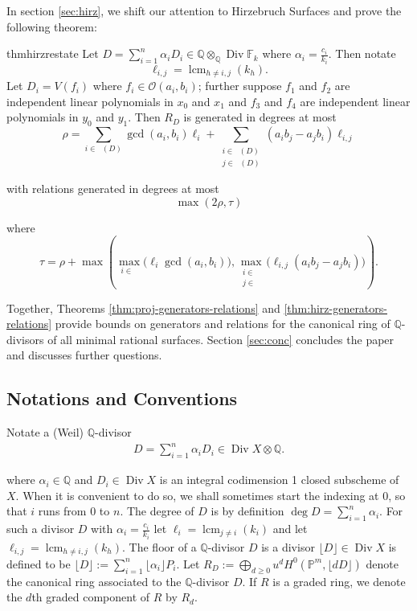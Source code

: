 \documentclass{amsart}
\theoremstyle{plain}
\theoremstyle{definition}
\theoremstyle{remark}
\numberwithin{equation}{section}
\newcommand\ssec{\subsection}
\newcommand\bq{{\mathbb Q}}
\newcommand\bp{{\mathbb P}}
\newcommand\sco{{\mathscr O}}
\DeclareMathOperator\di{Div}
\newcommand\bida{a}
\newcommand\bidb{b}
\newcommand\hirz{\mathbb{F}}
\DeclareMathOperator{\Te}{T_=}
\DeclareMathOperator{\Tp}{T_+}
\DeclareMathOperator{\Tm}{T_-}
\DeclareMathOperator{\lcm}{lcm}
\begin{document}
\noindent
In section \ref{sec:hirz}, we shift our attention to Hirzebruch Surfaces and prove the following theorem:

\begin{restatable}{thm}{hirzrestate}
\label{thm:hirz-generators-relations}
Let $D = \sum_{i=1}^n \alpha_i D_i \in \bq \otimes_\bq \di \hirz_k$ 
where $\alpha_i = \frac{c_i}{k_i}$.
Then notate
\[\ell_{i,j} = \lcm_{h\ne i,j}(k_h).\] 
Let $D_i =
V(f_i)$ where $f_i \in \sco(a_i, b_i)$; further suppose $f_1$ and $f_2$ are
independent linear
polynomials in $x_0$ and $x_1$ and $f_3$ and $f_4$ are independent
linear polynomials in $y_0$ and $y_1$.
Then $R_D$ is generated in degrees at most
\[
	\rho = \sum_{i\in \Te(D)} \gcd(\bida_i, \bidb_i)\ell_i +
	\sum_{\substack{i \in \Tp(D) \\	j \in \Tm(D)}} (\bida_i \bidb_j
	- \bida_j \bidb_i) \ell_{i, j}
\]

\noindent
with relations generated in degrees at most 
\[
	\max(2 \rho, \tau)
\]

\noindent
where
\[
	\tau = \rho
	+ \max \left( \max_{i\in \Te} \bigl(\ell_i \gcd(a_i, b_i) \bigr),
	\max_{\substack{i \in \Tp \\ j \in \Tm}} \bigl(\ell_{i, j}
	(\bida_i \bidb_j - \bida_j \bidb_i) \bigr) \right).
\]
\end{restatable}

\noindent
Together, Theorems \ref{thm:proj-generators-relations} and \ref{thm:hirz-generators-relations} provide bounds on generators and relations for the canonical ring of $\bq$-divisors of all minimal rational surfaces.  Section \ref{sec:conc} concludes the paper and discusses further questions.

\ssec{Notations and Conventions}
Notate a (Weil) $\bq$-divisor
\begin{align*}
	D = \sum_{i=1}^{n}\alpha_i D_i \in \di X \otimes \bq.
\end{align*}

\noindent
where $\alpha_i \in \bq$ and $D_i \in \di X$ is an integral codimension 1 closed subscheme of $X$. When it is convenient to do so, we shall sometimes start the indexing at $0$, so that $i$ runs from $0$ to $n$. The degree of $D$ is by definition $\deg D = \sum_{i=1}^{n}\alpha_i$. For such a divisor $D$ with $\alpha_i = \frac{c_i}{k_i}$ let $\ell_i = \lcm_{j\ne i}(k_i)$
and let $\ell_{i,j} = \lcm_{h\ne i,j}(k_h).$ The floor of a $\bq$-divisor $D$ is a divisor $\lfloor D
\rfloor \in \di X$ is defined to be $\lfloor D \rfloor := \sum_{i = 1}^{n}
\lfloor \alpha_i \rfloor P_i$. Let $
	R_D := \bigoplus_{d \geq 0} u^d H^0(\bp^m, \lfloor dD \rfloor)$
denote the canonical ring associated to the $\bq$-divisor $D$. If $R$
is a graded ring, we denote the $d$th graded component of $R$ by $R_d$.
\end{document}
